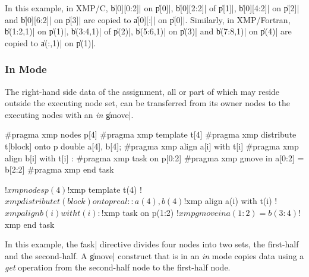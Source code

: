 In this example, in XMP/C, \|b[0][0:2]| on \|p[0]|, \|b[0][2:2]| of
\|p[1]|, \|b[0][4:2]| on \|p[2]| and \|b[0][6:2]| on \|p[3]| are copied
to \|a[0][:]| on \|p[0]|. Similarly, in XMP/Fortran, \|b(1:2,1)| on
\|p(1)|, \|b(3:4,1)| of \|p(2)|, \|b(5:6,1)| on \|p(3)| and \|b(7:8,1)|
on \|p(4)| are copied to \|a(:,1)| on \|p(1)|.


\subsubsection{In Mode}


The right-hand side data of the assignment, all or part of which may
reside outside the executing node set, can be transferred from its owner
nodes to the executing nodes with an {\it in} \|gmove|.

\begin{XCexample}
#pragma xmp nodes p[4]
#pragma xmp template t[4]
#pragma xmp distribute t[block] onto p
double a[4], b[4];
#pragma xmp align a[i] with t[i]
#pragma xmp align b[i] with t[i]
   :
#pragma xmp task on p[0:2]
#pragma xmp gmove in
  a[0:2] = b[2:2]
#pragma xmp end task
\end{XCexample}

\begin{XFexample}
!$xmp nodes p(4)
!$xmp template t(4)
!$xmp distribute t(block) onto p
real :: a(4), b(4)
!$xmp align a(i) with t(i)
!$xmp align b(i) with t(i)
   :
!$xmp task on p(1:2)
!$xmp gmove in
  a(1:2) = b(3:4)
!$xmp end task
\end{XFexample}

In this example, the \|task| directive divides four nodes into
two sets, the first-half and the second-half. A \|gmove| construct that
is in an {\it in} mode copies data using a {\it get} operation from
the second-half node to the first-half node.

